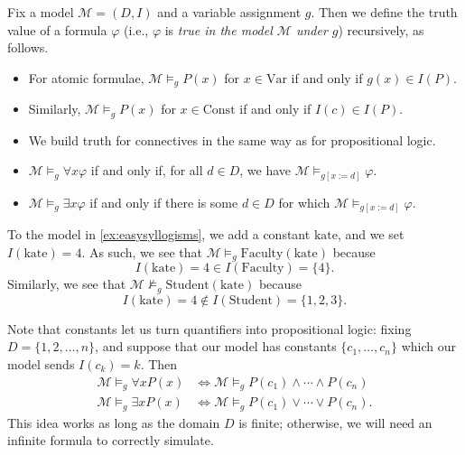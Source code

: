 \documentclass[../notes.tex]{subfiles}
\begin{document}
\begin{defihelper}[Truth]
	Fix a model $\mathcal M=(D,I)$ and a variable assignment $g$. Then we define the truth value of a formula $\varphi$ (i.e., $\varphi$ is \textit{true in the model $\mathcal M$ under $g$}) recursively, as follows.
	\begin{itemize}
		\item For atomic formulae, $\mathcal M\models_gP(x)$ for $x\in\mathrm{Var}$ if and only if $g(x)\in I(P)$.
		\item Similarly, $\mathcal M\models_gP(x)$ for $x\in\mathrm{Const}$ if and only if $I(c)\in I(P)$.
		\item We build truth for connectives in the same way as for propositional logic.
		\item $\mathcal M\models_g\forall x\varphi$ if and only if, for all $d\in D$, we have $\mathcal M\models_{g[x:=d]}\varphi$.
		\item $\mathcal M\models_g\exists x\varphi$ if and only if there is some $d\in D$ for which $\mathcal M\models_{g[x:=d]}\varphi$.
	\end{itemize}
\end{defihelper}
\begin{example}
	To the model in \autoref{ex:easysyllogisms}, we add a constant $\mathrm{kate}$, and we set $I(\mathrm{kate})=4$. As such, we see that $\mathcal M\models_g\mathrm{Faculty}(\mathrm{kate})$ because
	\[I(\mathrm{kate})=4\in I(\mathrm{Faculty})=\{4\}.\]
	Similarly, we see that $\mathcal M\nvDash_g\mathrm{Student}(\mathrm{kate})$ because
	\[I(\mathrm{kate})=4\notin I(\mathrm{Student})=\{1,2,3\}.\]
\end{example}
Note that constants let us turn quantifiers into propositional logic: fixing $D=\{1,2,\ldots,n\}$, and suppose that our model has constants $\{c_1,\ldots,c_n\}$ which our model sends $I(c_k)=k$. Then
\begin{align*}
	\mathcal M\models_g\forall xP(x) &\iff\mathcal M\models_gP(c_1)\land\cdots\land P(c_n) \\
	\mathcal M\models_g\exists xP(x) &\iff\mathcal M\models_gP(c_1)\lor\cdots\lor P(c_n).
\end{align*}
This idea works as long as the domain $D$ is finite; otherwise, we will need an infinite formula to correctly simulate.
\end{document}
